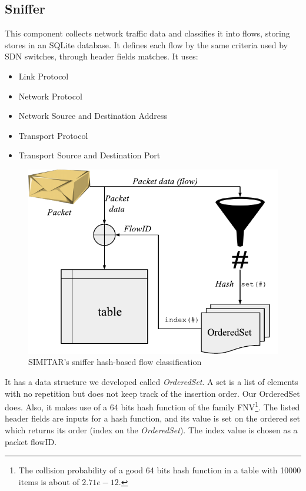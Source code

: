 \subsection{Sniffer}


This component collects network traffic data and classifies it into flows, storing stores in an SQLite database. It defines each flow by the same criteria used by SDN switches\cite{sdn-survey},  through header fields matches. It uses:

\begin{itemize}
\item Link Protocol
\item Network Protocol
\item Network Source and Destination Address
\item Transport Protocol
\item Transport Source and Destination Port
\end{itemize}

\begin{figure}[ht!]
        \centering
        \includegraphics[width=\linewidth]{figures/sniffer-classifier}
        \caption{SIMITAR's sniffer hash-based flow classification}
    \label{fig:sniffer}
\end{figure}
 
It has a data structure we developed called \textit{OrderedSet}. A set is a list of elements with no repetition but does not keep track of the insertion order. Our OrderedSet does. Also, it makes use of a  64 bits hash function of the family FNV\footnote{The collision probability of a good 64 bits hash function in a table with 10000 items is about of $2.71e-12$.}. The listed header fields are inputs for a hash function, and its value is set on the ordered set which returns its order (index on the \textit{OrderedSet}). The index value is chosen as a packet flowID.

